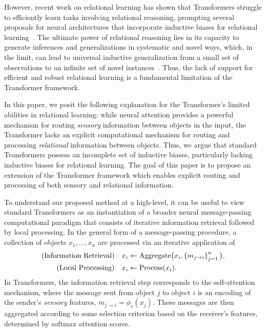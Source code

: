 
However, recent work on relational learning has shown that Transformers struggle to efficiently learn tasks involving relational reasoning, prompting several proposals for neural architectures that incorporate inductive biases for relational learning~\citep{santoroSimpleNeuralNetwork2017,santoroRelationalRecurrentNeural2018,shanahanExplicitlyRelationalNeurala,webbEmergentSymbolsBinding2021,webbRelationalBottleneckInductive2024,kergNeuralArchitectureInductive2022,altabaa2024abstractors,altabaaLearningHierarchicalRelational2024}. The ultimate power of relational reasoning lies in its capacity to generate inferences and generalizations in systematic and novel ways, which, in the limit, can lead to universal inductive generalization from a small set of observations to an infinite set of novel instances~\citep{goyal2022inductive}. Thus, the lack of support for efficient and robust relational learning is a fundamental limitation of the Transformer framework.

In this paper, we posit the following explanation for the Transformer's limited abilities in relational learning: while neural attention provides a powerful mechanism for routing \textit{sensory} information between objects in the input, the Transformer lacks an explicit computational mechanism for routing and processing \textit{relational} information between objects. Thus, we argue that standard Transformers possess an incomplete set of inductive biases, particularly lacking inductive biases for relational learning. The goal of this paper is to propose an extension of the Transformer framework which enables explicit routing and processing of both sensory and relational information.

To understand our proposed method at a high-level, it can be useful to view standard Transformers as an instantiation of a broader neural message-passing computational paradigm that consists of iterative information retrieval followed by local processing. In the general form of a message-passing procedure, a collection of objects $x_1,\ldots, x_n$ are processed via an iterative application of
\begin{equation}\label{eq:intro_message_passing}
  \begin{split}
    \text{(Information Retrieval)} \quad x_i &\gets \mathrm{Aggregate}\big(x_i, \left\{m_{j \to i}\right\}_{j=1}^{n}\big), \\
    \text{(Local Processing)} \quad x_i &\gets \mathrm{Process}(x_i).
  \end{split}
\end{equation}
In Transformers, the information retrieval step corresponds to the self-attention mechanism, where the message sent from object $j$ to object $i$ is an encoding of the sender's \textit{sensory} features, $m_{j \to i} = \phi_v(x_j)$. These messages are then aggregated according to some selection criterion based on the receiver's features, determined by softmax attention scores.


